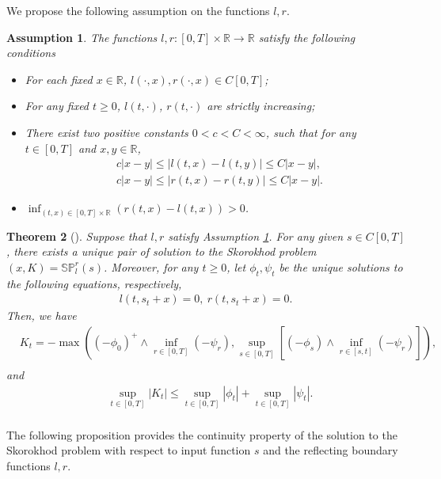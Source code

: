 \documentclass[10pt]{article}%
\numberwithin{equation}{section}
\newtheorem{theorem}{Theorem}[section]
\newtheorem{assumption}[theorem]{Assumption}
\begin{document}
We propose the following assumption on the functions $l,r$.
\begin{assumption}\label{asslr}
The functions $l,r:[0,T] \times \mathbb{R}\rightarrow \mathbb{R}$ satisfy the following conditions
\begin{itemize}
\item[(i)] For each fixed $x\in\mathbb{R}$, $l(\cdot,x),r(\cdot,x)\in C[0,T]$;
\item[(ii)] For any fixed $t\geq 0$, $l(t,\cdot)$, $r(t,\cdot)$ are strictly increasing;
\item[(iii)] There exist two positive constants $0<c<C<\infty$, such that for any $t\in [0,T]$ and $x,y\in \mathbb{R}$,
\begin{align*}
&c|x-y|\leq |l(t,x)-l(t,y)|\leq C|x-y|,\\
&c|x-y|\leq |r(t,x)-r(t,y)|\leq C|x-y|.
\end{align*} 
\item[(iv)] $\inf_{(t,x)\in[0,T]\times\mathbb{R}}(r(t,x)-l(t,x))>0$.
\end{itemize}
\end{assumption}

\begin{theorem}[\cite{Li}]\label{SP}
Suppose that $l,r$ satisfy Assumption \ref{asslr}. For any given $s\in C[0,T]$, there exists a unique pair of solution to the Skorokhod problem $(x,K)=\mathbb{SP}_l^r(s)$. Moreover, for any $t\geq 0$, let $\phi_t,\psi_t$ be the unique solutions to the following equations, respectively, 
    \begin{align*}
        l(t,s_t+x)=0,\ r(t,s_t+x)=0.
    \end{align*}
    Then, we have 
    \begin{align*}
        &K_t=-\max\left((-\phi_0)^{+}\wedge  \inf_{r\in[0,T]}(-\psi_r), \sup_{s\in[0,T]}\left[(-\phi_s) \wedge  \inf_{r\in[s,t]}(-\psi_r)\right]\right),\\
    \end{align*}
    and 
   \begin{align*}
        &\sup_{t\in[0,T]}\left|K_t\right|\leq \sup_{t\in[0,T]}\left|\phi_t\right|+\sup_{t\in[0,T]}\left|\psi_t\right|.\\
    \end{align*} 
\end{theorem}

The following proposition provides the continuity property of the solution  to the Skorokhod problem with respect to input function $s$ and the reflecting boundary functions $l,r$.
\end{document}
